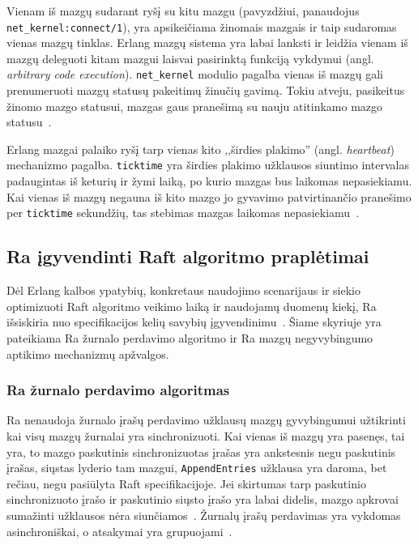 \documentclass{VUMIFPSkursinis}
\begin{document}
Vienam iš mazgų sudarant ryšį su kitu mazgu (pavyzdžiui, panaudojus \texttt{net\_kernel:connect/1}), yra apsikeičiama žinomais mazgais ir taip sudaromas vienas mazgų tinklas. Erlang mazgų sistema yra labai lanksti ir leidžia vienam iš mazgų deleguoti kitam mazgui laisvai pasirinktą funkciją vykdymui (angl. \textit{arbitrary code execution}). \texttt{net\_kernel} modulio pagalba vienas iš mazgų gali prenumeruoti mazgų statusų pakeitimų žinučių gavimą. Tokiu atveju, pasikeitus žinomo mazgo statusui, mazgas gaus pranešimą su nauju atitinkamo mazgo statusu~\cite{erlang_distributed, hebert_learn_2013}.

Erlang mazgai palaiko ryšį tarp vienas kito ,,širdies plakimo'' (angl. \emph{heartbeat}) mechanizmo pagalba. \texttt{ticktime} yra širdies plakimo užklausos siuntimo intervalas padaugintas iš keturių ir žymi laiką, po kurio mazgas bus laikomas nepasiekiamu. Kai vienas iš mazgų negauna iš kito mazgo jo gyvavimo patvirtinančio pranešimo per \texttt{ticktime} sekundžių, tas stebimas mazgas laikomas nepasiekiamu~\cite{hebert_learn_2013}.

\subsection{Ra įgyvendinti Raft algoritmo praplėtimai}

Dėl Erlang kalbos ypatybių, konkretaus naudojimo scenarijaus ir siekio optimizuoti Raft algoritmo veikimo laiką ir naudojamų duomenų kiekį, Ra išsiskiria nuo specifikacijos kelių savybių įgyvendinimu~\cite{rabbitmqra}. Šiame skyriuje yra pateikiama Ra žurnalo perdavimo algoritmo ir Ra mazgų negyvybingumo aptikimo mechanizmų apžvalgos. 

\subsubsection{Ra žurnalo perdavimo algoritmas}

Ra nenaudoja žurnalo įrašų perdavimo užklausų mazgų gyvybingumui užtikrinti kai visų mazgų žurnalai yra sinchronizuoti. Kai vienas iš mazgų yra pasenęs, tai yra, to mazgo paskutinis sinchronizuotas įrašas yra ankstesnis negu paskutinis įrašas, siųstas lyderio tam mazgui, \texttt{AppendEntries} užklausa yra daroma, bet rečiau, negu pasiūlyta Raft specifikacijoje. Jei skirtumas tarp paskutinio sinchronizuoto įrašo ir paskutinio siųsto įrašo yra labai didelis, mazgo apkrovai sumažinti užklausos nėra siunčiamos~\cite{rabbitmqra}. Žurnalų įrašų perdavimas yra vykdomas asinchroniškai, o atsakymai yra grupuojami~\cite{rabbitmqra}.
\end{document}

